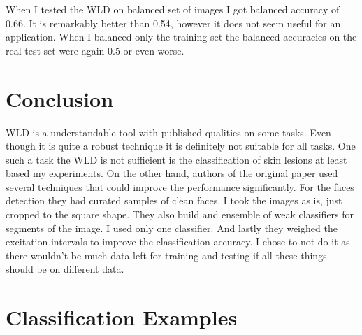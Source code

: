 \documentclass[a4paper,10pt,twocolumn]{article}
\begin{document}
When I tested the WLD on balanced set of images I got balanced accuracy of 0.66.
It is remarkably better than 0.54, however it does not seem useful for an application.
When I balanced only the training set the balanced accuracies on the real test set were again 0.5 or even worse.

\section{Conclusion}

WLD is a understandable tool with published qualities on some tasks.
Even though it is quite a robust technique\cite{chen2010wld} it is definitely not suitable for all tasks.
One such a task the WLD is not sufficient is the classification of skin lesions at least based my experiments.
On the other hand, authors of the original paper used several techniques that could improve the performance significantly.
For the faces detection they had curated samples of clean faces.
I took the images as is, just cropped to the square shape.
They also build and ensemble of weak classifiers for segments of the image.
I used only one classifier.
And lastly they weighed the excitation intervals to improve the classification accuracy. 
I chose to not do it as there wouldn't be much data left for training and testing if all these things should be on different data.





\appendix

\section{Classification Examples}
\end{document}
